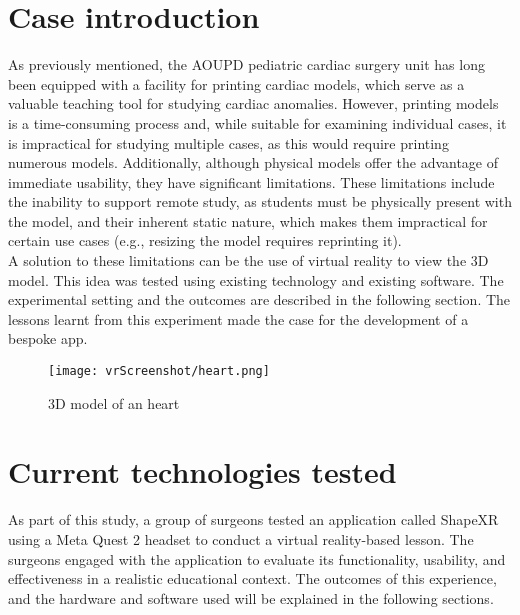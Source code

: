 \section{Case introduction}
\noindent
As previously mentioned, the \ac{AOUPD} pediatric cardiac surgery unit has long been equipped with a facility for printing cardiac models, which serve as a valuable teaching tool for studying cardiac anomalies.
However, printing models is a time-consuming process and, while suitable for examining individual cases, it is impractical for studying multiple cases, as this would require printing numerous models.
Additionally, although physical models offer the advantage of immediate usability, they have significant limitations.
These limitations include the inability to support remote study, as students must be physically present with the model, and their inherent static nature, which makes them impractical for certain use cases (e.g., resizing the model requires reprinting it).\\
A solution to these limitations can be the use of virtual reality to view the 3D model.
This idea was tested using existing technology and existing software. The experimental setting and the outcomes are described in the following section.
The lessons learnt from this experiment made the case for the development of a bespoke app. 

\begin{figure}[ht]
  \centering
  \texttt{[image: vrScreenshot/heart.png]}
  \caption{3D model of an heart}
  \label{fig:heart}
\end{figure}

\section{Current technologies tested}
\noindent
As part of this study, a group of surgeons tested an application called ShapeXR using a Meta Quest 2 headset to conduct a virtual reality-based lesson.
The surgeons engaged with the application to evaluate its functionality, usability, and effectiveness in a realistic educational context.
The outcomes of this experience, and the hardware and software used will be explained in the following sections.

